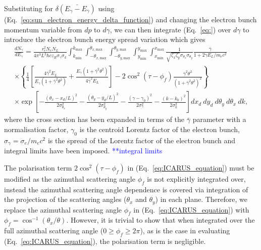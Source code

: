 \documentclass[../main.tex]{subfiles}
\begin{document}
Substituting for $\delta\left(\bar{E_{\gamma}-E_{\gamma}}\right)$ using (Eq.~\ref{eq:sun_electron_energy_delta_function}) and changing the electron bunch momentum variable from $dp$ to $d\gamma$, we can then integrate (Eq.~\ref{eq:}) over $d\gamma$ to introduce the electron bunch energy spread variation which gives
\begin{multline}
\frac{dN_{\gamma}}{dE_{\gamma}} = \frac{r_{e}^{2}N_{e}N_{L}}{4\pi^{3}L^{2}\hbar c z_{R}\sigma_{\gamma}\sigma_{k}}\int_{k_{\mathrm{min}}}^{k_{\mathrm{max}}}\int_{-\theta_{x,\mathrm{max}}}^{\theta_{x,\mathrm{max}}}\int_{-\theta_{y,\mathrm{max}}}^{\theta_{y,\mathrm{max}}}\int_{y_{\mathrm{min}}}^{y_{\mathrm{max}}}\int_{x_{\mathrm{min}}}^{x_{\mathrm{max}}}\frac{1}{\sqrt{\zeta_{x}\zeta_{y}}\sigma_{\theta_{x}}\sigma_{\theta_{y}}}\frac{\bar{\gamma}}{1+2\gamma E_{L}/m_{e}c^{2}} \\
\times\left\{\frac{1}{4}\left[\frac{4\bar{\gamma}^{2}E_{L}}{E_{\gamma}\left(1+\bar{\gamma}^{2}\theta^{2}\right)}+\frac{E_{\gamma}\left(1+\bar{\gamma}^{2}\theta^{2}\right)}{4\bar{\gamma}^{2}E_{L}}\right]-2\cos^{2}\left(\tau-\phi_{f}\right)\frac{\bar{\gamma}^{2}\theta^{2}}{\left(1+\bar{\gamma}^{2}\theta^{2}\right)^{2}}\right\} \\
\times\exp{\left[-\frac{\left(\theta_{x}-x_{d}/L\right)^{2}}{2\sigma_{\theta_{x}}^{2}}-\frac{\left(\theta_{y}-y_{d}/L\right)^{2}}{2\sigma_{\theta_{y}}^{2}}-\frac{\left(\gamma-\gamma_{0}\right)^{2}}{2\sigma_{\gamma}^{2}}-\frac{\left(k-k_{0}\right)^{2}}{2\sigma_{k}^{2}}\right]}dx_{d}~dy_{d}~d\theta_{y}~d\theta_{x}~dk,
\label{eq:ICARUS_equation}
\end{multline}
where the cross section has been expanded in terms of the $\bar{\gamma}$ parameter with a normalisation factor, $\gamma_{0}$ is the centroid Lorentz factor of the electron bunch, $\sigma_{\gamma} = \sigma_{e}/m_{e}c^{2}$ is the spread of the Lorentz factor of the electron bunch and integral limits have been imposed. \textcolor{blue}{**integral limits}


The polarisation term $2\cos^{2}\left(\tau-\phi_{f}\right)$ in (Eq.~\ref{eq:ICARUS_equation}) must be modified as the azimuthal scattering angle $\phi_{f}$ is not explicitly integrated over, instead the azimuthal scattering angle dependence is covered via integration of the projection of the scattering angles ($\theta_{x}$ and $\theta_{y}$) in each plane. Therefore, we replace the azimuthal scattering angle $\phi_{f}$ in (Eq.~\ref{eq:ICARUS_equation}) with $\phi_{f} = \cos^{-1}\left(\theta_{x}/\theta\right)$. However, it is trivial to show that when integrated over the full azimuthal scattering angle ($0 \geq \phi_{f} \geq 2\pi$), as is the case in evaluating (Eq.~\ref{eq:ICARUS_equation}), the polarisation term is negligible. 
 
\end{document}
